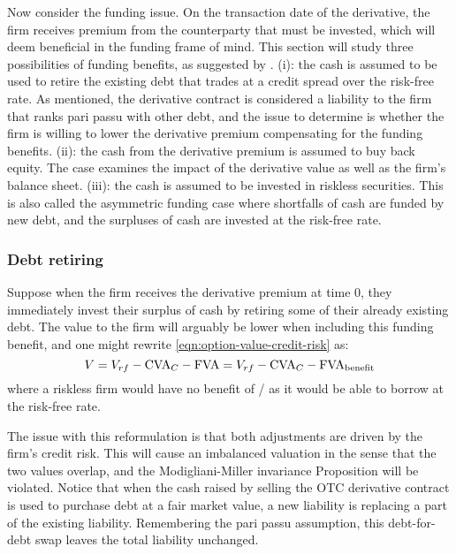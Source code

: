 \documentclass[../main.tex]{subfiles}
\begin{document}
        Now consider the funding issue. On the transaction date of the derivative, 
        the firm receives premium from the counterparty that must be invested, 
        which will deem beneficial in the funding frame of mind. 
        This section will study three possibilities of funding benefits, 
        as suggested by \textcite{Hillion2016}.
        (i): the cash is assumed to be used to retire the existing debt 
        that trades at a credit spread over the risk-free rate. 
        As mentioned, the derivative contract is considered a liability to the firm
        that ranks pari passu with other debt, 
        and the issue to determine is whether the firm is willing to lower the derivative premium 
        compensating for the funding benefits. 
        (ii): the cash from the derivative premium is assumed to buy back equity. 
        The case examines the impact of the derivative value as well as the firm's balance sheet. 
        (iii): the cash is assumed to be invested in riskless securities. 
        This is also called the asymmetric funding case where shortfalls of cash are funded by new debt, 
        and the surpluses of cash are invested at the risk-free rate.

        \subsubsection{Debt retiring}
            Suppose when the firm receives the derivative premium at time 0, 
            they immediately invest their surplus of cash by retiring some of their already existing debt. 
            The value to the firm will arguably be lower when including this funding benefit, 
            and one might rewrite \cref{eqn:option-value-credit-risk} as:
            \begin{equation}
                V = V_{rf} - \CVA/_C - \FVA/ = V_{rf} - \CVA/_C - \FBA/
            \end{equation}
            where a riskless firm would have no benefit of \FVA/ as it would be able to borrow at the risk-free rate.
            
            The issue with this reformulation is that both adjustments are driven by the firm's credit risk. 
            This will cause an imbalanced valuation in the sense that the two values overlap, 
            and the Modigliani-Miller invariance Proposition will be violated. 
            Notice that when the cash raised by selling the OTC derivative contract 
            is used to purchase debt at a fair market value, a new liability is replacing a part of the existing liability. 
            Remembering the pari passu assumption, this debt-for-debt swap leaves the total liability unchanged.
\end{document}
